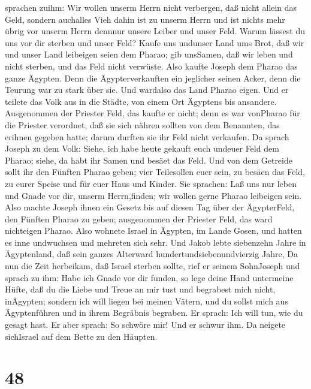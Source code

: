 sprachen zuihm: Wir wollen unserm Herrn nicht verbergen, daß nicht
allein das Geld, sondern auchalles Vieh dahin ist zu unserm Herrn und
ist nichts mehr übrig vor unserm Herrn dennnur unsere Leiber und unser
Feld.  Warum lässest du uns vor dir sterben und unser Feld?
Kaufe uns undunser Land ums Brot, daß wir und unser Land leibeigen seien
dem Pharao; gib unsSamen, daß wir leben und nicht sterben, und das Feld
nicht verwüste.  Also kaufte Joseph dem Pharao das ganze
Ägypten. Denn die Ägypterverkauften ein jeglicher seinen Acker, denn die
Teurung war zu stark über sie. Und wardalso das Land Pharao eigen.
 Und er teilete das Volk aus in die Städte, von einem Ort
Ägyptens bis ansandere.  Ausgenommen der Priester Feld, das
kaufte er nicht; denn es war vonPharao für die Priester verordnet, daß
sie sich nähren sollten von dem Benannten, das erihnen gegeben hatte;
darum durften sie ihr Feld nicht verkaufen.  Da sprach
Joseph zu dem Volk: Siehe, ich habe heute gekauft euch undeuer Feld dem
Pharao; siehe, da habt ihr Samen und besäet das Feld.  Und
von dem Getreide sollt ihr den Fünften Pharao geben; vier Teilesollen
euer sein, zu besäen das Feld, zu eurer Speise und für euer Haus und
Kinder.  Sie sprachen: Laß uns nur leben und Gnade vor dir,
unserm Herrn,finden; wir wollen gerne Pharao leibeigen sein.
 Also machte Joseph ihnen ein Gesetz bis auf diesen Tag
über der ÄgypterFeld, den Fünften Pharao zu geben; ausgenommen der
Priester Feld, das ward nichteigen Pharao.  Also wohnete
Israel in Ägypten, im Lande Gosen, und hatten es inne undwuchsen und
mehreten sich sehr.  Und Jakob lebte siebenzehn Jahre in
Ägyptenland, daß sein ganzes Alterward hundertundsiebenundvierzig Jahre,
 Da nun die Zeit herbeikam, daß Israel sterben sollte, rief
er seinem SohnJoseph und sprach zu ihm: Habe ich Gnade vor dir funden,
so lege deine Hand untermeine Hüfte, daß du die Liebe und Treue an mir
tust und begrabest mich nicht, inÄgypten;  sondern ich will
liegen bei meinen Vätern, und du sollst mich aus Ägyptenführen und in
ihrem Begräbnis begraben. Er sprach: Ich will tun, wie du gesagt hast.
 Er aber sprach: So schwöre mir! Und er schwur ihm. Da
neigete sichIsrael auf dem Bette zu den Häupten.

\hypertarget{section-47}{%
\section{48}\label{section-47}}

